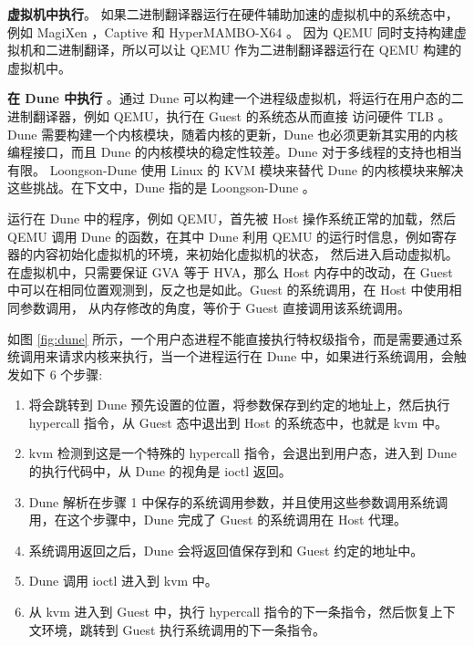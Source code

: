 \textbf{虚拟机中执行}。
如果二进制翻译器运行在硬件辅助加速的虚拟机中的系统态中，例如 MagiXen ，Captive 和 HyperMAMBO-X64 \citep{d2017hypermambo} 。
因为 QEMU 同时支持构建虚拟机和二进制翻译，所以可以让 QEMU 作为二进制翻译器运行在 QEMU 构建的虚拟机中。

\textbf{在 Dune 中执行} \citep{belay2012dune}。通过 Dune 可以构建一个进程级虚拟机，将运行在用户态的二进制翻译器，例如 QEMU，执行在 Guest 的系统态从而直接
访问硬件 TLB \citep{faravelon2018acceleration}。Dune 需要构建一个内核模块，随着内核的更新，Dune 也必须更新其实用的内核编程接口，而且 Dune 的内核模块的稳定性较差。Dune 对于多线程的支持也相当有限。
Loongson-Dune \citep{loongsonDune} 使用 Linux 的 KVM 模块来替代 Dune 的内核模块来解决这些挑战。在下文中，Dune 指的是 Loongson-Dune 。

运行在 Dune 中的程序，例如 QEMU，首先被 Host 操作系统正常的加载，然后 QEMU 调用 Dune 的函数，在其中 Dune 利用 QEMU 的运行时信息，例如寄存器的内容初始化虚拟机的环境，来初始化虚拟机的状态，
然后进入启动虚拟机。在虚拟机中，只需要保证 GVA 等于 HVA，那么 Host 内存中的改动，在 Guest 中可以在相同位置观测到，反之也是如此。Guest 的系统调用，在 Host 中使用相同参数调用，
从内存修改的角度，等价于 Guest 直接调用该系统调用。

如图 \ref{fig:dune} 所示，一个用户态进程不能直接执行特权级指令，而是需要通过系统调用来请求内核来执行，当一个进程运行在 Dune 中，如果进行系统调用，会触发如下 6 个步骤:
\begin{enumerate}
	\item 将会跳转到 Dune 预先设置的位置，将参数保存到约定的地址上，然后执行 hypercall 指令，从 Guest 态中退出到 Host 的系统态中，也就是 kvm 中。
	\item kvm 检测到这是一个特殊的 hypercall 指令，会退出到用户态，进入到 Dune 的执行代码中，从 Dune 的视角是 ioctl 返回。
	\item Dune 解析在步骤 1 中保存的系统调用参数，并且使用这些参数调用系统调用，在这个步骤中，Dune 完成了 Guest 的系统调用在 Host 代理。
	\item 系统调用返回之后，Dune 会将返回值保存到和 Guest 约定的地址中。
	\item Dune 调用 ioctl 进入到 kvm 中。
	\item 从 kvm 进入到 Guest 中，执行 hypercall 指令的下一条指令，然后恢复上下文环境，跳转到 Guest 执行系统调用的下一条指令。
\end{enumerate}


